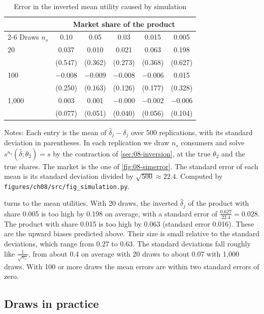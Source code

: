 \begin{table}[htbp]
\centering
\caption{Error in the inverted mean utility caused by simulation}\label{tab:08-simdelta}
\begin{tabular}{lccccc}
\toprule
 & \multicolumn{5}{c}{Market share of the product} \\
\cmidrule(lr){2-6}
Draws $n_s$ & 0.10 & 0.05 & 0.03 & 0.015 & 0.005 \\
\midrule
20    & 0.037 & 0.010 & 0.021 & 0.063 & 0.198 \\
      & (0.547) & (0.362) & (0.273) & (0.368) & (0.627) \\
100   & $-0.008$ & $-0.009$ & $-0.008$ & $-0.006$ & 0.015 \\
      & (0.250) & (0.163) & (0.126) & (0.177) & (0.328) \\
1,000 & 0.003 & 0.001 & $-0.000$ & $-0.002$ & $-0.006$ \\
      & (0.077) & (0.051) & (0.040) & (0.056) & (0.104) \\
\bottomrule
\end{tabular}

\smallskip
\begin{minipage}{0.86\linewidth}
\footnotesize Notes: Each entry is the mean of $\hat\delta_j - \delta_j$ over 500 replications, with its standard
deviation in parentheses. In each replication we draw $n_s$ consumers and solve $s^{n_s}(\hat\delta; \theta_2) =
s$ by the contraction of \cref{sec:08-inversion}, at the true $\theta_2$ and the true shares. The market is the one
of \cref{fig:08-simerror}. The standard error of each mean is its standard deviation divided by
$\sqrt{500} \approx 22.4$. Computed by \texttt{figures/ch08/src/fig\_simulation.py}.
\end{minipage}
\end{table}

 turns to the mean utilities. With 20 draws, the inverted $\hat\delta_j$ of the product
with share 0.005 is too high by 0.198 on average, with a standard error of $\frac{0.627}{22.4} = 0.028$. The
product with share 0.015 is too high by 0.063 (standard error 0.016). These are the upward biases predicted
above. Their size is small relative to the standard deviations, which range from 0.27 to 0.63. The standard
deviations fall roughly like $\frac{1}{\sqrt{n_s}}$, from about 0.4 on average with 20 draws to about 0.07 with
1,000 draws. With 100 or more draws the mean errors are within two standard errors of zero.

\subsection{Draws in practice}\label{sec:08-draws}

